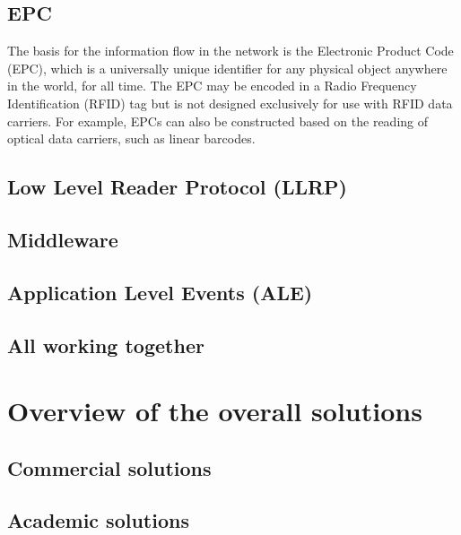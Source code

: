 
\subsection{EPC} \label{epcglobal}

The basis for the information flow in the network is the Electronic Product Code (EPC), which is a universally unique identifier for any physical object anywhere in the world, for all time. 
The EPC may be encoded in a Radio Frequency Identification (RFID) tag but is not designed exclusively for use with RFID data carriers. For example, EPCs can also be constructed based on the reading of optical data carriers, such as linear barcodes.



\subsection{Low Level Reader Protocol (LLRP)}


\subsection{Middleware}


\subsection{Application Level Events (ALE)}


\subsection{All working together}


\section{Overview of the overall solutions}

\subsection{Commercial solutions}


\subsection{Academic solutions}

